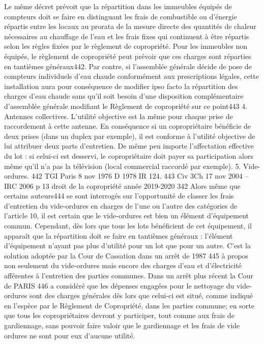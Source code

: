 		Le même décret prévoit que la répartition dans les immeubles équipés de compteurs doit se faire en distinguant les frais de combustible ou d'énergie répartis entre les locaux au prorata de la mesure directe des quantités de chaleur nécessaires au chauffage de l'eau et les frais fixes qui continuent à être répartis selon les règles fixées par le règlement de copropriété.
		Pour les immeubles non équipés, le règlement de copropriété peut prévoir que ces charges sont réparties en tantièmes généraux442.
		Par contre, si l'assemblée générale décide de pose de compteurs individuels d’eau chaude conformément aux prescriptions légales, cette installation aura pour conséquence de modifier ipso facto la répartition des charges d’eau chaude sans qu’il soit besoin d’une disposition complémentaire d’assemblée générale modifiant le Règlement de copropriété sur ce point443
		4. Antennes collectives.
		L'utilité objective est la même pour chaque prise de raccordement à cette antenne. En conséquence si un copropriétaire bénéficie de deux prises (dans un duplex par exemple), il est conforme à l'utilité objective de lui attribuer deux parts d'entretien.
		De même peu importe l'affectation effective du lot : si celui-ci est desservi, le copropriétaire doit payer sa participation alors même qu'il n'a pas la télévision (local commercial raccordé par exemple).
		5. Vide-ordures.
		442 TGI Paris 8 nov 1976 D 1978 IR 124.
		443 Civ 3\degres Ch 17 nov 2004 – IRC 2006  p 13
		droit de la copropriété année 2019-2020
		342
		Alors même que certains auteurs444 se sont interrogés sur l'opportunité de classer les frais d'entretien du vide-ordures en charges de l'une ou l'autre des catégories de l'article 10, il est certain que le vide-ordures est bien un élément d'équipement commun. Cependant, dès lors que tous les lots bénéficient de cet équipement, il apparaît que la répartition doit se faire en tantièmes généraux : l'élément d'équipement n'ayant pas plus d'utilité pour un lot que pour un autre.
		C'est la solution adoptée par la Cour de Cassation dans un arrêt de 1987 445 à propos non seulement du vide-ordures mais encore des charges d'eau et d'électricité afférentes à l'entretien des parties communes.
		Dans un arrêt plus récent la Cour de PARIS 446 a considéré que les dépenses engagées pour le nettoyage du vide-ordures sont des charges générales dès lors que celui-ci est situé, comme indiqué en l'espèce par le Règlement de Copropriété, dans les parties commune; en sorte que tous les copropriétaires devront y participer, tout comme aux frais de gardiennage, sans pouvoir faire valoir que le gardiennage et les frais de vide ordures ne sont pour eux d'aucune utilité.
